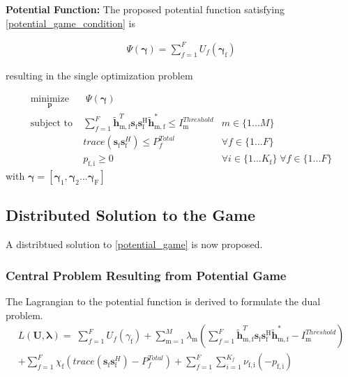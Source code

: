 \documentclass[12pt,a4paper]{report}
\begin{document}
\textbf{Potential Function:} The proposed potential function satisfying \eqref{potential_game_condition} is 

\begin{gather*} \label{Potential_Function}
\Psi(\mathbf{\gamma}) = \sum_{f = 1}^{F} U_f(\mathbf{\gamma_{\mathrm{f}}}) 
\end{gather*}

resulting in the single optimization problem 
	
		\begin{subequations}
	\label{optim}
	\begin{align}
	    \underset{\mathbf{p}}{\text{minimize}}
	    & \; \Psi(\mathbf{\gamma}) \label{potential_game} \\
	    \text{subject to} \; &
	  \sum^F_{f=1} \mathbf{\tilde{h}}_{\mathrm{m,f}}^T  \mathbf{s}_{\mathrm{f}} 						
	\mathbf{s_{\mathrm{f}}^{\mathrm{H}}} \mathbf{\tilde{h}_{\mathrm{m,f}}^*} \leq I^{Threshold}		
	_{\mathrm{m}} & m \in \{1 ...M\} 
		\label{interference_const}\\
        & trace(\mathbf{s}_\mathrm{f}\mathbf{s}_\mathrm{f}^H)  \leq P^{Total}_{f}  \label{power_const}
        & \forall f \in \{1 ... F\}\\
        & p_{\mathrm{f,i}} \geq 0 &  \forall i \in \{1 ...K_{\mathrm{f}}\} \; \forall f \in \{1 ... F\}\label{pos_power_const}
	\end{align}
	\end{subequations}
	with $\mathbf{\gamma}= [\mathbf{\gamma_{\mathrm{1}}},\mathbf{\gamma_{\mathrm{2}}}...\mathbf{\gamma_{\mathrm{F}}}]$


\subsection{Distributed Solution to the Game}
A distribtued solution to \eqref{potential_game} is now proposed.
\subsubsection{Central Problem Resulting from Potential Game}
The Lagrangian to the potential function is derived to formulate the dual problem. 
\begin{multline}
L(\mathbf{U,\lambda}) = 
\;
\sum_{f=1}^F U_f(\gamma_{\text{f}}) 
+
\sum_{\mathrm{m=1}}^M \lambda_{\mathrm{m}}
(	  \sum^F_{f=1} \mathbf{\tilde{h}}_{\mathrm{m,f}}^T  \mathbf{s}_{\mathrm{f}} 						
	\mathbf{s_{\mathrm{f}}^{\mathrm{H}}} \mathbf{\tilde{h}_{\mathrm{m,f}}^*} - I^{Threshold}		
	_{\mathrm{m}} )
\\
+ 
\sum_{f=1}^F
\chi_{\mathrm{f}}(trace(\mathbf{s}_\mathrm{f}\mathbf{s}_\mathrm{f}^H)-P^{Total}_{f} )
+
\sum_{f=1}^F 
\sum_{i=1}^{K_f}
\nu_{\mathrm{f,i}}(-p_{\mathrm{f,i}})
\end{multline}
\end{document}
